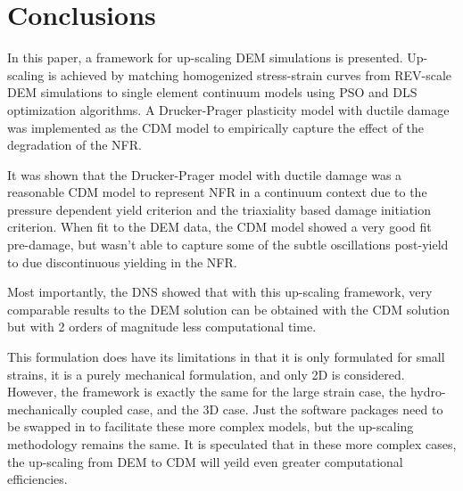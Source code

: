 \section{Conclusions}
In this paper, a framework for up-scaling DEM simulations is presented. Up-scaling is achieved by matching homogenized stress-strain curves from REV-scale DEM simulations to single element continuum models using PSO and DLS optimization algorithms. A Drucker-Prager plasticity model with ductile damage was implemented as the CDM model to empirically capture the effect of the degradation of the NFR.

It was shown that the Drucker-Prager model with ductile damage was a reasonable CDM model to represent NFR in a continuum context due to the pressure dependent yield criterion and the triaxiality based damage initiation criterion. When fit to the DEM data, the CDM model showed a very good fit pre-damage, but wasn't able to capture some of the subtle oscillations post-yield to due discontinuous yielding in the NFR.

Most importantly, the DNS showed that with this up-scaling framework, very comparable results to the DEM solution can be obtained with the CDM solution but with 2 orders of magnitude less computational time.

This formulation does have its limitations in that it is only formulated for small strains, it is a purely mechanical formulation, and only 2D is considered. However, the framework is exactly the same for the large strain case, the hydro-mechanically coupled case, and the 3D case. Just the software packages need to be swapped in to facilitate these more complex models, but the up-scaling methodology remains the same. It is speculated that in these more complex cases, the up-scaling from DEM to CDM will yeild even greater computational efficiencies. 











\clearpage